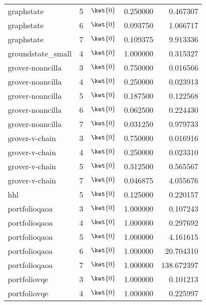 \begin{table}
{{\begin{minipage}[t]{0.5\textwidth}
\begin{tabular}{lrlrr}
    graphstate & 5 & $\ket{0}$ & 0.250000 & 0.467307 \\
    graphstate & 6 & $\ket{0}$ & 0.093750 & 1.066717 \\
    graphstate & 7 & $\ket{0}$ & 0.109375 & 9.913336 \\
    \midrule
    groundstate\_small & 4 & $\ket{0}$ & 1.000000 & 0.315327 \\
    \midrule
    grover-noancilla & 3 & $\ket{0}$ & 0.750000 & 0.016566 \\
    grover-noancilla & 4 & $\ket{0}$ & 0.250000 & 0.023913 \\
    grover-noancilla & 5 & $\ket{0}$ & 0.187500 & 0.122568 \\
    grover-noancilla & 6 & $\ket{0}$ & 0.062500 & 0.224430 \\
    grover-noancilla & 7 & $\ket{0}$ & 0.031250 & 0.979733 \\
    \midrule
    grover-v-chain & 3 & $\ket{0}$ & 0.750000 & 0.016916 \\
    grover-v-chain & 4 & $\ket{0}$ & 0.250000 & 0.023310 \\
    grover-v-chain & 5 & $\ket{0}$ & 0.312500 & 0.565567 \\
    grover-v-chain & 7 & $\ket{0}$ & 0.046875 & 4.055676 \\
    \midrule
    hhl & 5 & $\ket{0}$ & 0.125000 & 0.220157 \\
    \midrule
    portfolioqaoa & 3 & $\ket{0}$ & 1.000000 & 0.107243 \\
    portfolioqaoa & 4 & $\ket{0}$ & 1.000000 & 0.297692 \\
    portfolioqaoa & 5 & $\ket{0}$ & 1.000000 & 4.161615 \\
    portfolioqaoa & 6 & $\ket{0}$ & 1.000000 & 20.704310 \\
    portfolioqaoa & 7 & $\ket{0}$ & 1.000000 & 138.672397 \\
    \midrule
    portfoliovqe & 3 & $\ket{0}$ & 1.000000 & 0.101213 \\
    portfoliovqe & 4 & $\ket{0}$ & 1.000000 & 0.225997 \\

\end{tabular}
\end{minipage}}}
\end{table}
